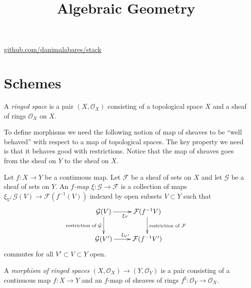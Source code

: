 



\title{Algebraic Geometry}
\maketitle

\label{section-phantom}
\hfill
\href{http://github.com/danimalabares/stack}{github.com/danimalabares/stack}

\tableofcontents

\section{Schemes}
\label{section-schemes}

\begin{definition}
\label{definition-ringed-space}
A {\it ringed space} is a pair $(X, \mathcal{O}_X)$ consisting
of a topological space $X$ and a sheaf of rings $\mathcal{O}_X$
on $X$.
\end{definition}

To define morphisms we need the following notion of map of sheaves to be ``well
behaved'' with respect to a map of topological spaces. The key property we need
is that it behaves good with restrictions. Notice that the map of sheaves goes
from the sheaf on $Y$ to the sheaf on $X$.

\begin{definition}
\label{definition-f-map}
Let $f : X \to Y$ be a continuous map.
Let $\mathcal{F}$ be a sheaf of sets on $X$ and
let $\mathcal{G}$ be a sheaf of sets on $Y$.
An {\it $f$-map $\xi : \mathcal{G} \to \mathcal{F}$}
is a collection of maps
$\xi_V : \mathcal{G}(V) \to \mathcal{F}(f^{-1}(V))$
indexed by open subsets $V \subset Y$ such that
$$
\xymatrix{
\mathcal{G}(V) \ar[r]_{\xi_V} \ar[d]_{\text{restriction of }\mathcal{G}} &
\mathcal{F}(f^{-1}V) \ar[d]^{\text{restriction of }\mathcal{F}} \\
\mathcal{G}(V') \ar[r]^{\xi_{V'}} &
\mathcal{F}(f^{-1}V')
}
$$
commutes for all $V' \subset V \subset Y$ open.
\end{definition}

\begin{definition}
\label{definition-ringed-space-morphism}
A {\it morphism of ringed spaces}
$(X, \mathcal{O}_X) \to (Y, \mathcal{O}_Y)$ is a pair
consisting of a continuous map $f : X \to Y$ and an
$f$-map of sheaves of rings
$f^\sharp : \mathcal{O}_Y \to \mathcal{O}_X$.
\end{definition}

